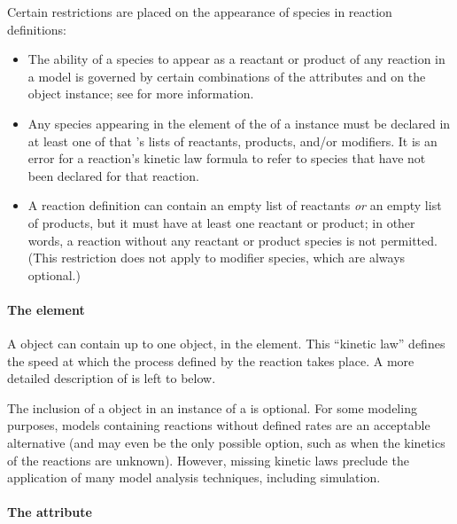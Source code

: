 Certain restrictions are placed on the appearance of species in
reaction definitions:
\begin{itemize}
  
\item The ability of a species to appear as a reactant or product
  of any reaction in a model is governed by certain combinations
  of the attributes  and 
  on the \Species object instance; see
   for more information.
  
\item Any species appearing in the  element of the
   of a \Reaction instance must be declared in
  at least one of that \Reaction's lists of reactants, products,
  and/or modifiers.  It is an error for a reaction's kinetic law
  formula to refer to species that have not been declared for that
  reaction.
  
\item A reaction definition can contain an empty list of reactants
  \emph{or} an empty list of products, but it must have at least
  one reactant or product; in other words, a reaction without any
  reactant or product species is not permitted.  (This restriction
  does not apply to modifier species, which are always optional.)

\end{itemize}


\paragraph{The  element}

A \Reaction object can contain up to one \KineticLaw object, in
the  element.  This ``kinetic law'' defines the
speed at which the process defined by the reaction takes place.  A
more detailed description of \KineticLaw is left to
 below.

The inclusion of a \KineticLaw object in an instance of a
\Reaction is optional.  For some modeling purposes, models
containing reactions without defined rates are an acceptable
alternative (and may even be the only possible option, such as
when the kinetics of the reactions are unknown).  However, missing
kinetic laws preclude the application of many model analysis
techniques, including simulation.


\paragraph{The  attribute}
\label{sec:reversible}

